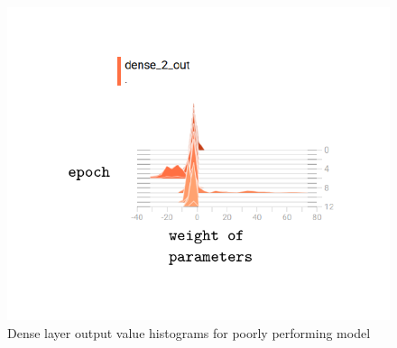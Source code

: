\documentclass{article}
\begin{document}
\begin{figure}[h]
  \includegraphics[scale=0.8]{baddenseout.pdf}
  \caption{Dense layer output value histograms for poorly performing model}
  \label{fig:baddenseout}
\end{figure}
\end{document}

